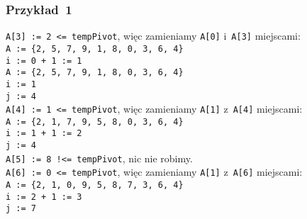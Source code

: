 \documentclass[10pt,t]{beamer}
\begin{document}
\begin{frame}
  \frametitle{Przykład~1}


  \texttt{A[3] := 2 <= tempPivot}, więc zamieniamy \texttt{A[0]}
  i~\texttt{A[3]} miejscami: \\
  \texttt{A := \{2, 5, 7, 9, 1, 8, 0, 3, 6, 4\} } \\
  \texttt{i := 0 + 1 := 1} \\
  \texttt{A := \{2, 5, 7, 9, 1, 8, 0, 3, 6, 4\} } \\
  \texttt{i := 1} \\
  \texttt{j := 4} \\
  \texttt{A[4] := 1 <= tempPivot}, więc zamieniamy \texttt{A[1]}
  z~\texttt{A[4]} miejscami: \\
  \texttt{A := \{2, 1, 7, 9, 5, 8, 0, 3, 6, 4\} } \\
  \texttt{i := 1 + 1 := 2} \\
  \texttt{j := 4} \\
  \texttt{A[5] := 8 !<= tempPivot}, nic nie robimy. \\
  \texttt{A[6] := 0 <= tempPivot}, więc zamieniamy \texttt{A[1]}
  z~\texttt{A[6]} miejscami: \\
  \texttt{A := \{2, 1, 0, 9, 5, 8, 7, 3, 6, 4\} } \\
  \texttt{i := 2 + 1 := 3} \\
  \texttt{j := 7}

\end{frame}
\end{document}
